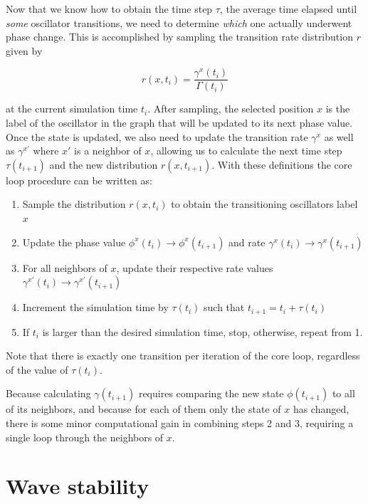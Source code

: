 Now that we know how to obtain the time step $\tau$, the average time elapsed until \textit{some} oscillator transitions, we need to
determine \textit{which} one actually underwent phase change. This is accomplished by sampling the transition rate distribution $r$
given by

\begin{equation}
	r(x,t_i)=\frac{\gamma^x(t_i)}{\Gamma(t_i)}
\end{equation}

\noindent at the current simulation time $t_i$. After sampling, the selected position $x$ is the label of the oscillator in the graph
that will be updated to its next phase value. Once the state is updated, we also need to update the transition rate $\gamma^x$ as well
as $\gamma^{x'}$ where $x'$ is a neighbor of $x$, allowing us to calculate the next time step $\tau(t_{i+1})$ and the new distribution
$r(x,t_{i+1})$. With these definitions the core loop procedure can be written as:

\begin{enumerate}
	\item Sample the distribution $r(x,t_i)$ to obtain the transitioning oscillators label $x$
	\item Update the phase value $\phi^x(t_i) \to \phi^x(t_{i+1})$ and rate $\gamma^x(t_i) \to \gamma^x(t_{i+1})$
	\item For all neighbors of $x$, update their respective rate values $\gamma^{x'}(t_i) \to \gamma^{x'}(t_{i+1})$
	\item Increment the simulation time by $\tau(t_i)$ such that $t_{i+1} = t_i + \tau(t_i)$
	\item If $t_{i}$ is larger than the desired simulation time, stop, otherwise, repeat from 1.
\end{enumerate}

Note that there is exactly one transition per iteration of the core loop, regardless of the value of $\tau(t_i)$.

Because calculating $\gamma(t_{i+1})$ requires comparing the new state $\phi(t_{i+1})$ to all of its neighbors, and because for each of
them only the state of $x$ has changed, there is some minor computational gain in combining steps 2 and 3, requiring a single loop
through the neighbors of $x$.

\section{Wave stability}

